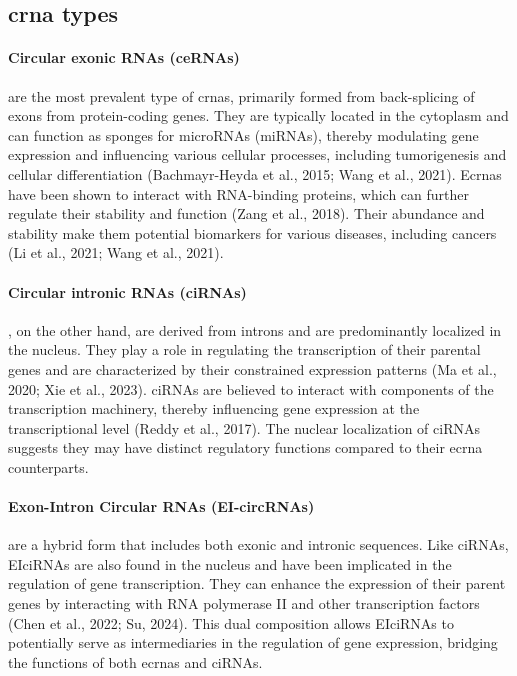 \subsection{\gls{crna} types}
\label{sec:circrna_types}

\paragraph{Circular exonic RNAs (ceRNAs)} are the most prevalent type of
\gls{crna}s, primarily formed from back-splicing of exons from protein-coding
genes.
They are typically located in the cytoplasm and can function as sponges for
microRNAs (miRNAs), thereby modulating gene expression and influencing various
cellular processes, including tumorigenesis and cellular differentiation
(Bachmayr-Heyda et al., 2015; Wang et al., 2021).
E\gls{crna}s have been shown to interact with RNA-binding proteins, which can
further regulate their stability and function (Zang et al., 2018).
Their abundance and stability make them potential biomarkers for various
diseases, including cancers (Li et al., 2021; Wang et al., 2021).

\paragraph{Circular intronic RNAs (ciRNAs)}, on the other hand, are derived
from introns
and are predominantly localized in the nucleus.
They play a role in regulating the transcription of their parental genes and
are characterized by their constrained expression patterns (Ma et al., 2020;
Xie et al., 2023).
ciRNAs are
believed to interact with components of the transcription machinery, thereby
influencing gene expression at the transcriptional level (Reddy et al., 2017).
The nuclear localization of ciRNAs suggests they may have distinct regulatory
functions compared to their e\gls{crna} counterparts.

\paragraph{Exon-Intron Circular RNAs (EI-circRNAs)} are a hybrid form that
includes both
exonic and intronic sequences.
Like ciRNAs, EIciRNAs are also found in the nucleus and have been implicated in
the regulation of gene transcription.
They can enhance the expression of their parent genes by interacting with RNA
polymerase II and other transcription factors (Chen et al., 2022; Su, 2024).
This dual composition allows EIciRNAs to potentially serve as intermediaries in
the regulation of gene expression, bridging the functions of both e\gls{crna}s
and ciRNAs.

